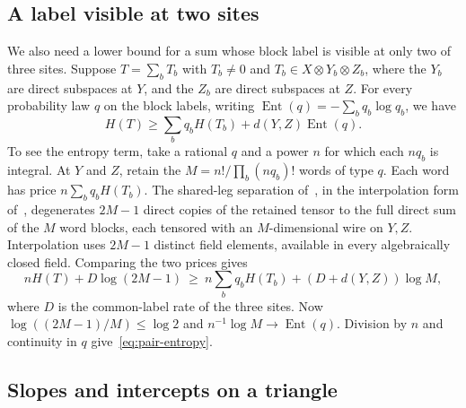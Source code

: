 \subsection{A label visible at two sites}

We also need a lower bound for a sum whose block label is visible at
only two of three sites. Suppose $T=\sum_b T_b$ with $T_b\ne0$ and
$T_b\in X\otimes Y_b\otimes Z_b$, where the $Y_b$ are direct subspaces
at $Y$, and the $Z_b$ are direct subspaces at $Z$. For every probability
law $q$ on the block labels, writing
$\operatorname{Ent}(q)=-\sum_b q_b\log q_b$, we have
\begin{equation}
 H(T)\ge\sum_b q_b H(T_b)+d(Y,Z)\operatorname{Ent}(q).
 \label{eq:pair-entropy}
\end{equation}
To see the entropy term, take a rational $q$ and a power $n$ for which
each $nq_b$ is integral. At $Y$ and $Z$, retain the
$M=n!/\prod_b(nq_b)!$ words of type $q$. Each word has price
$n\sum_bq_bH(T_b)$. The shared-leg separation of~\cite[Proposition~3.1]{nine},
in the interpolation form of~\cite[Proposition~2.1]{lu}, degenerates
$2M-1$ direct copies of the retained tensor to the full direct sum of
the $M$ word blocks, each tensored with an $M$-dimensional wire on
$Y,Z$. Interpolation uses $2M-1$ distinct field elements, available
in every algebraically closed field. Comparing the two prices gives
\[
 nH(T)+D\log(2M-1)\ \ge\
 n\sum_bq_bH(T_b)+(D+d(Y,Z))\log M ,
\]
where $D$ is the common-label rate of the three sites.
Now $\log((2M-1)/M)\le\log2$ and $n^{-1}\log M\to\operatorname{Ent}(q)$.
Division by $n$ and continuity in $q$ give~\eqref{eq:pair-entropy}.

\subsection{Slopes and intercepts on a triangle}

